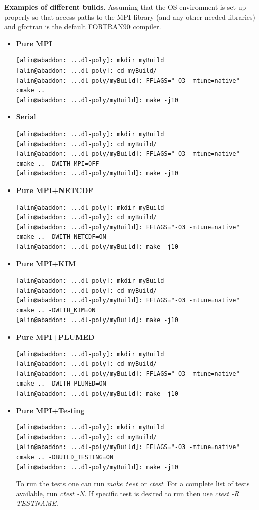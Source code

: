{\bf Examples of different builds}.  Assuming that the OS environment
is set up properly so that access paths to the MPI library (and any
other needed libraries) and gfortran is the default FORTRAN90 compiler.
\begin{itemize}
\item {\bf Pure MPI}
\begin{lstlisting}
[alin@abaddon: ...dl-poly]: mkdir myBuild
[alin@abaddon: ...dl-poly]: cd myBuild/
[alin@abaddon: ...dl-poly/myBuild]: FFLAGS="-O3 -mtune=native" cmake ..
[alin@abaddon: ...dl-poly/myBuild]: make -j10
\end{lstlisting}

\item {\bf Serial}
\begin{lstlisting}
[alin@abaddon: ...dl-poly]: mkdir myBuild
[alin@abaddon: ...dl-poly]: cd myBuild/
[alin@abaddon: ...dl-poly/myBuild]: FFLAGS="-O3 -mtune=native" cmake .. -DWITH_MPI=OFF
[alin@abaddon: ...dl-poly/myBuild]: make -j10
\end{lstlisting}

\item {\bf Pure MPI+NETCDF}
\begin{lstlisting}
[alin@abaddon: ...dl-poly]: mkdir myBuild
[alin@abaddon: ...dl-poly]: cd myBuild/
[alin@abaddon: ...dl-poly/myBuild]: FFLAGS="-O3 -mtune=native" cmake .. -DWITH_NETCDF=ON
[alin@abaddon: ...dl-poly/myBuild]: make -j10
\end{lstlisting}

\item {\bf Pure MPI+KIM}
\begin{lstlisting}
[alin@abaddon: ...dl-poly]: mkdir myBuild
[alin@abaddon: ...dl-poly]: cd myBuild/
[alin@abaddon: ...dl-poly/myBuild]: FFLAGS="-O3 -mtune=native" cmake .. -DWITH_KIM=ON
[alin@abaddon: ...dl-poly/myBuild]: make -j10
\end{lstlisting}

\item {\bf Pure MPI+PLUMED}
\begin{lstlisting}
[alin@abaddon: ...dl-poly]: mkdir myBuild
[alin@abaddon: ...dl-poly]: cd myBuild/
[alin@abaddon: ...dl-poly/myBuild]: FFLAGS="-O3 -mtune=native" cmake .. -DWITH_PLUMED=ON
[alin@abaddon: ...dl-poly/myBuild]: make -j10
\end{lstlisting}

\item {\bf Pure MPI+Testing}
\begin{lstlisting}
[alin@abaddon: ...dl-poly]: mkdir myBuild
[alin@abaddon: ...dl-poly]: cd myBuild/
[alin@abaddon: ...dl-poly/myBuild]: FFLAGS="-O3 -mtune=native" cmake .. -DBUILD_TESTING=ON
[alin@abaddon: ...dl-poly/myBuild]: make -j10
\end{lstlisting}
To run the tests one can run {\sl make}~$test$ or {\sl ctest}.
For a complete list of tests available, run {\sl ctest -N}.
If specific test is desired to run then use {\sl ctest -R TESTNAME}.
\end{itemize}

